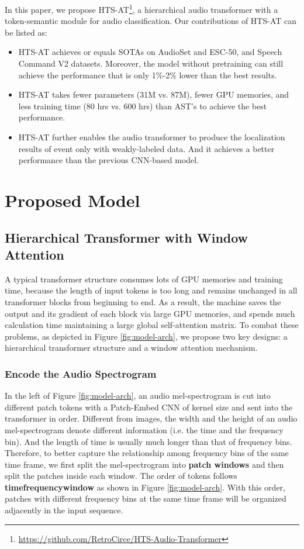 \documentclass{article}
\begin{document}
In this paper, we propose HTS-AT\footnote{\href{https://github.com/RetroCirce/HTS-Audio-Transformer}{https://github.com/RetroCirce/HTS-Audio-Transformer}}, a hierarchical audio transformer with a token-semantic module for audio classification. Our contributions of HTS-AT can be listed as:
\begin{itemize}[leftmargin=.15in]
    \item HTS-AT achieves or equals SOTAs on AudioSet and ESC-50, and Speech Command V2 datasets. Moreover, the model without pretraining can still achieve the performance that is only 1\%-2\% lower than the best results.
    \item HTS-AT takes fewer parameters (31M vs. 87M), fewer GPU memories, and less training time (80 hrs vs. 600 hrs) than AST's to achieve the best performance.
    \item HTS-AT further enables the audio transformer to produce the localization results of event only with weakly-labeled data. And it achieves a better performance than the previous CNN-based model. 
\end{itemize}
\vspace{-0.5cm}

\section{Proposed Model}
\vspace{-0.1cm}
\subsection{Hierarchical Transformer with Window Attention}
A typical transformer structure consumes lots of GPU memories and training time, because the length of input tokens is too long and remains unchanged in all transformer blocks from beginning to end. As a result, the machine saves the output and its gradient of each block via large GPU memories, and spends much calculation time maintaining a large global self-attention matrix. To combat these problems, as depicted in Figure \ref{fig:model-arch}, we propose two key designs: a hierarchical transformer structure and a window attention mechanism.
\vspace{-0.3cm}
\subsubsection{Encode the Audio Spectrogram}
In the left of Figure \ref{fig:model-arch}, an audio mel-spectrogram is cut into different patch tokens with a Patch-Embed CNN of kernel size  and sent into the transformer in order. 
Different from images, the width and the height of an audio mel-spectrogram denote different information (i.e. the time and the frequency bin). And the length of time is usually much longer than that of frequency bins. 
Therefore, to better capture the relationship among frequency bins of the same time frame, we first split the mel-spectrogram into \textbf{patch windows}  and then split the patches inside each window. The order of tokens follows \textbf{timefrequencywindow} as shown in Figure \ref{fig:model-arch}.
With this order, patches with different frequency bins at the same time frame will be organized adjacently in the input sequence.
\end{document}
